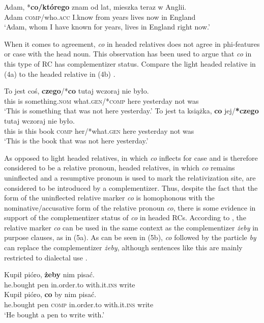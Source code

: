 \documentclass[output=paper]{langsci/langscibook}
\begin{document}
\ea%
    \label{ex:leska:3}
    \gll Adam, *\textbf{co/którego} znam od lat, mieszka teraz w Anglii.    \\
         Adam \textsc{comp}/who\textsc{.acc} I.know from years lives now in England\\
    \glt ‘Adam, whom I have known for years, lives in England right now.’
    \z


When it comes to agreement, \textit{co} in headed relatives does not agree in phi-features or case with the head noun. This observation has been used to argue that \textit{co} in this type of RC has complementizer status. Compare the light headed relative in (4a) to the headed relative in (4b) \citep{Citko2004}.

\ea%
    \label{ex:leska:4}
    \ea
    \gll To   jest   coś,   \textbf{czego}/*\textbf{co}   tutaj  wczoraj    nie   było.   \\
         this   is   something.\textsc{nom}   what.\textsc{gen}/*\textsc{comp}  here  yesterday  not   was\\
    \glt ‘This is something that was not here yesterday.’
    \ex
    \gll To   jest   ta   książka,   \textbf{co}   jej/\textbf{*czego}   tutaj  wczoraj   nie  było.        \\
         this   is   this   book   \textsc{comp}   her/*what.\textsc{gen}   here   yesterday  not  was\\
    \glt ‘This is the book that was not here yesterday.’
    \z
\z

As opposed to light headed relatives, in which \textit{co} inflects for case and is therefore considered to be a relative pronoun, headed relatives, in which \textit{co} remains uninflected and a resumptive pronoun is used to mark the relativization site, are considered to be introduced by a complementizer. Thus, despite the fact that the form of the uninflected relative marker \textit{co} is homophonous with the nominative\slash accusative form of the relative pronoun \textit{co}, there is some evidence in support of the complementizer status of \textit{co} in headed RCs. According to \citet{Bondaruk1995}, the relative marker \textit{co} can be used in the same context as the complementizer \textit{żeby} in purpose clauses, as in (5a). As can be seen in (5b), \textit{co} followed by the particle \textit{by} can replace the complementizer \textit{żeby}, although sentences like this are mainly restricted to dialectal use \citep[35]{Bondaruk1995}.

\ea%
    \label{ex:leska:5}
    \ea
    \gll Kupił   pióro,  \textbf{żeby} nim   pisać.\\
         he.bought   pen   in.order.to   with.it.\textsc{ins}  write\\
    \ex
    \gll Kupił   pióro,   \textbf{co}   by   nim   pisać.\\
         he.bought   pen   \textsc{comp} in.order.to   with.it.\textsc{ins}  write\\
    \glt ‘He bought a pen to write with.’
    \z
\z
\end{document}

